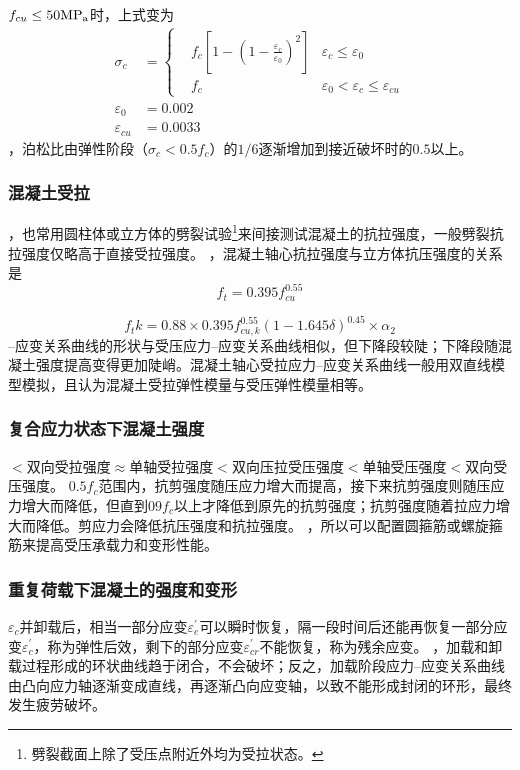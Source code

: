 \documentclass{article}
\newcommand{\gb}{《混凝土结构设计规范》（GB 50010）}
\begin{document}
$f_{cu} \leq 50\rm{MP_a}$时，上式变为
\begin{align*}
    \sigma_c         & =
    \left\{ \begin{aligned}
                 & f_c[1-(1-\frac{\varepsilon_c}{\varepsilon_0})^2] & \varepsilon_c \leq \varepsilon_0                    \\
                 & f_c                                              & \varepsilon_0 < \varepsilon_c \leq \varepsilon_{cu}
            \end{aligned} \right. \\
    \varepsilon_0    & =0.002                                                                                         \\
    \varepsilon_{cu} & =0.0033
\end{align*}
，泊松比由弹性阶段（$\sigma_c<0.5f_c$）的$1/6$逐渐增加到接近破坏时的$0.5$以上。
\subsubsection{混凝土受拉}
，也常用圆柱体或立方体的劈裂试验\footnote{劈裂截面上除了受压点附近外均为受拉状态。}来间接测试混凝土的抗拉强度，一般劈裂抗拉强度仅略高于直接受拉强度。
，混凝土轴心抗拉强度与立方体抗压强度的关系是
$$
    f_t = 0.395 f_{cu}^{0.55}
$$
\par{}
$$
    f_tk = 0.88 \times 0.395 f_{cu,k}^{0.55} (1-1.645\delta)^{0.45}\times \alpha_2
$$
--应变关系曲线的形状与受压应力--应变关系曲线相似，但下降段较陡；下降段随混凝土强度提高变得更加陡峭。混凝土轴心受拉应力--应变关系曲线一般用双直线模型模拟，且认为混凝土受拉弹性模量与受压弹性模量相等。
\subsubsection{复合应力状态下混凝土强度}
$<$双向受拉强度$\approx$单轴受拉强度$<$双向压拉受压强度$<$单轴受压强度$<$双向受压强度。
$0.5f_c$范围内，抗剪强度随压应力增大而提高，接下来抗剪强度则随压应力增大而降低，但直到$09f_c$以上才降低到原先的抗剪强度；抗剪强度随着拉应力增大而降低。剪应力会降低抗压强度和抗拉强度。
，所以可以配置圆箍筋或螺旋箍筋来提高受压承载力和变形性能。
\subsubsection{重复荷载下混凝土的强度和变形}
$\varepsilon_c$并卸载后，相当一部分应变$\varepsilon_e^{\prime}$可以瞬时恢复，隔一段时间后还能再恢复一部分应变$\varepsilon_c^{\prime}$，称为弹性后效，剩下的部分应变$\varepsilon_{cr}^{\prime}$不能恢复，称为残余应变。
，加载和卸载过程形成的环状曲线趋于闭合，不会破坏；反之，加载阶段应力--应变关系曲线由凸向应力轴逐渐变成直线，再逐渐凸向应变轴，以致不能形成封闭的环形，最终发生疲劳破坏。
\end{document}
